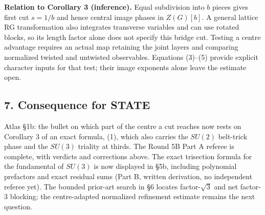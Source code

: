 \documentclass[11pt,a4paper]{article}
\begin{document}
\textbf{Relation to Corollary 3 (inference).} Equal subdivision into
\(b\) pieces gives first cut \(s=1/b\) and hence central image phases in
\(Z(G)[b]\). A general lattice RG transformation also integrates
transverse variables and can use rotated blocks, so its length factor
alone does not specify this bridge cut. Testing a centre advantage
requires an actual map retaining the joint layers and comparing
normalized twisted and untwisted observables. Equations (3)--(5) provide
explicit character inputs for that test; their image exponents alone
leave the estimate open.

\hypertarget{consequence-for-state}{%
\subsection{7. Consequence for STATE}\label{consequence-for-state}}

Atlas §1b: the bullet on which part of the centre a cut reaches now
rests on Corollary 3 of an exact formula, (1), which also carries the
\(SU(2)\) belt-trick phase and the \(SU(3)\) triality at thirds. The
Round 5B Part A referee is complete, with verdicts and corrections
above. The exact trisection formula for the fundamental of \(SU(3)\) is
now displayed in §5b, including polynomial prefactors and exact residual
sums (Part B, written derivation, no independent referee yet). The
bounded prior-art search in §6 locates factor-\(\sqrt3\) and net
factor-3 blocking; the centre-adapted normalized refinement estimate
remains the next question.
\end{document}
